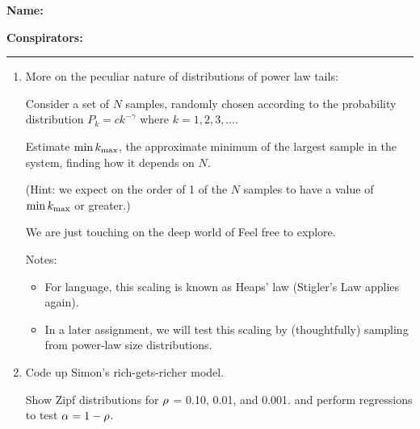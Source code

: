 \textbf{Name:} \\

\medskip

\textbf{Conspirators:} 

\medskip
\medskip

\hrule

\medskip



\begin{enumerate}

\item
  
  More on the peculiar nature of distributions of power law tails:
  
  Consider a set of $N$ samples,
  randomly chosen according
  to the probability
  distribution
  $P_{k} = c k^{-\gamma}$
  where
  $k = 1, 2, 3, \ldots$.


  Estimate $\min k_{\rm max}$, the approximate minimum of 
  the largest sample in the system,
  finding how it depends on $N$.  

  (Hint: we expect on
  the order of 1 of the $N$ samples to have a value
  of $\min k_{\rm max}$ or greater.)
  

  We are just touching on the deep world of
  Feel free to explore.

  
   \solutionstart


   \solutionend

  Notes:
  \begin{itemize}
  \item
    For language, this scaling is known as Heaps' law (Stigler's Law applies again).
  \item
    In a later assignment, we will test this scaling
    by (thoughtfully) sampling from power-law size distributions.
  \end{itemize}
  
  
\item

  Code up Simon's rich-gets-richer model.
  
  Show Zipf distributions for $\rho$ = 0.10, 0.01, and 0.001.
  and perform regressions to test
  $\alpha = 1 - \rho$.


\end{enumerate}
